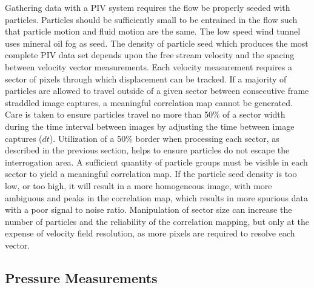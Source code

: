 Gathering data with a PIV system requires the flow be properly seeded with 
particles. Particles should be sufficiently small to be entrained in the flow 
such that particle motion and fluid motion are the same. The low speed wind 
tunnel uses mineral oil fog as seed. The density of particle seed which 
produces the most complete PIV data set depends upon the free stream velocity 
and 
the spacing between velocity vector measurements. Each velocity measurement 
requires a sector of pixels through which displacement can be tracked. If 
a majority of particles are allowed to travel outside of a given 
sector between consecutive frame straddled image captures, a meaningful 
correlation map cannot be 
generated. Care is taken to ensure particles travel no more than 50\% of a 
sector width during the time interval between images by adjusting the time 
between image captures ($dt$). 
Utilization of a 50\% border when processing each sector, as described in the 
previous section, helps to ensure particles do not escape the interrogation 
area. A sufficient quantity of particle groups must be visible in each sector 
to yield a meaningful correlation map. If the particle seed density is too low, 
or too high, it will result in a more homogeneous image, with more ambiguous 
and peaks in the correlation map, which results in more spurious data with a 
poor signal to noise ratio. Manipulation of sector size 
can increase the number of particles and the reliability of the correlation 
mapping, but only at the expense of velocity field resolution, as more pixels 
are required to resolve each vector.


\subsection{Pressure Measurements}

